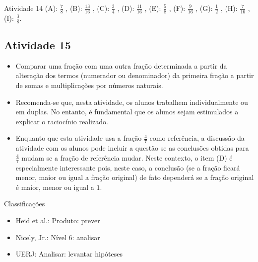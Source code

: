 \documentclass[oneside]{book}
\begin{document}
\begin{multicols}{2}
\begin{resposta*}{Atividade 14}
  (A):   $\frac{7}{8}$  ,  
  (B):   $\frac{13}{16}$  ,  
  (C):   $\frac{3}{4}$  ,   
  (D):   $\frac{11}{16}$  ,  
  (E):   $\frac{5}{8}$  ,  
  (F):   $\frac{9}{16}$  ,  
  (G):   $\frac{1}{2}$  ,  
  (H):   $\frac{7}{16}$  ,  
  (I):   $\frac{3}{8}$.  
\end{resposta*}



\subsection{Atividade 15}

\begin{itemize} %
    \item       Comparar uma fração com uma outra fração determinada a partir da 
alteração dos termos (numerador ou denominador) da primeira fração a partir de 
somas e multiplicações por números naturais.
\end{itemize} %
  
  
 
\begin{itemize} %
    \item       Recomenda-se que, nesta atividade, os alunos trabalhem 
individualmente ou em duplas. No entanto, é fundamental que os alunos sejam 
estimulados a explicar o raciocínio realizado.
    \item       Enquanto que esta atividade usa a fração       $\frac{4}{7}$     
  como referência, a discussão da atividade com os alunos pode incluir a questão 
se as conclusões obtidas para       $\frac{4}{7}$       mudam se a fração de 
referência mudar. Neste contexto, o item (D) é especialmente interessante pois, 
neste caso, a conclusão (se a fração ficará menor, maior ou igual a fração 
original) de fato dependerá se a fração original é maior, menor ou igual a       
$1$.
\end{itemize} %
  
  
  Classificações  
\begin{itemize} %
    \item       Heid et al.: Produto: prever
    \item       Nicely, Jr.: Nível 6: analisar
    \item       UERJ: Analisar: levantar hipóteses
\end{itemize} %


\end{multicols}
\end{document}
